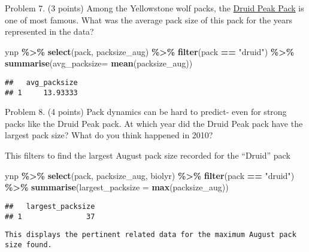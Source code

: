 \documentclass[
]{article}
\newenvironment{Shaded}{\begin{snugshade}}{\end{snugshade}}
\newcommand{\AttributeTok}[1]{\textcolor[rgb]{0.13,0.29,0.53}{#1}}
\newcommand{\FunctionTok}[1]{\textcolor[rgb]{0.13,0.29,0.53}{\textbf{#1}}}
\newcommand{\NormalTok}[1]{#1}
\newcommand{\SpecialCharTok}[1]{\textcolor[rgb]{0.81,0.36,0.00}{\textbf{#1}}}
\newcommand{\StringTok}[1]{\textcolor[rgb]{0.31,0.60,0.02}{#1}}
\begin{document}
Problem 7. (3 points) Among the Yellowstone wolf packs, the
\href{https://www.pbs.org/wnet/nature/in-the-valley-of-the-wolves-the-druid-wolf-pack-story/209/}{Druid
Peak Pack} is one of most famous. What was the average pack size of this
pack for the years represented in the data?

\begin{Shaded}
\begin{Highlighting}[]
\NormalTok{ynp }\SpecialCharTok{\%\textgreater{}\%}
  \FunctionTok{select}\NormalTok{(pack, packsize\_aug) }\SpecialCharTok{\%\textgreater{}\%}
  \FunctionTok{filter}\NormalTok{(pack }\SpecialCharTok{==} \StringTok{"druid"}\NormalTok{) }\SpecialCharTok{\%\textgreater{}\%}
  \FunctionTok{summarise}\NormalTok{(}\AttributeTok{avg\_packsize=} \FunctionTok{mean}\NormalTok{(packsize\_aug))}
\end{Highlighting}
\end{Shaded}

\begin{verbatim}
##   avg_packsize
## 1     13.93333
\end{verbatim}

Problem 8. (4 points) Pack dynamics can be hard to predict- even for
strong packs like the Druid Peak pack. At which year did the Druid Peak
pack have the largest pack size? What do you think happened in 2010?

This filters to find the largest August pack size recorded for the
``Druid'' pack

\begin{Shaded}
\begin{Highlighting}[]
\NormalTok{ynp }\SpecialCharTok{\%\textgreater{}\%}
  \FunctionTok{select}\NormalTok{(pack, packsize\_aug, biolyr) }\SpecialCharTok{\%\textgreater{}\%}
  \FunctionTok{filter}\NormalTok{(pack }\SpecialCharTok{==} \StringTok{"druid"}\NormalTok{) }\SpecialCharTok{\%\textgreater{}\%}
  \FunctionTok{summarise}\NormalTok{(}\AttributeTok{largest\_packsize =} \FunctionTok{max}\NormalTok{(packsize\_aug))}
\end{Highlighting}
\end{Shaded}

\begin{verbatim}
##   largest_packsize
## 1               37
\end{verbatim}

\begin{verbatim}
This displays the pertinent related data for the maximum August pack size found.
\end{verbatim}
\end{document}
